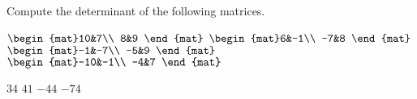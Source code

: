 
\begin{Exercise}[
name={},
title={}, 
difficulty=0,
origin={\cite{GH}}]
Compute the determinant of the following matrices.
\begin{multicols}{2}
\Question $\begin{mat}10&7\\  8&9 \end{mat}$
\Question $\begin{mat}6&-1\\  -7&8 \end{mat}$
\Question $\begin{mat}-1&-7\\  -5&9 \end{mat}$
\Question $\begin{mat}-10&-1\\  -4&7 \end{mat}$
\EndCurrentQuestion
\end{multicols}

\end{Exercise}
\begin{Answer}
\Question $34 $
\Question $41 $
\Question $-44 $
\Question $-74 $
\end{Answer}
